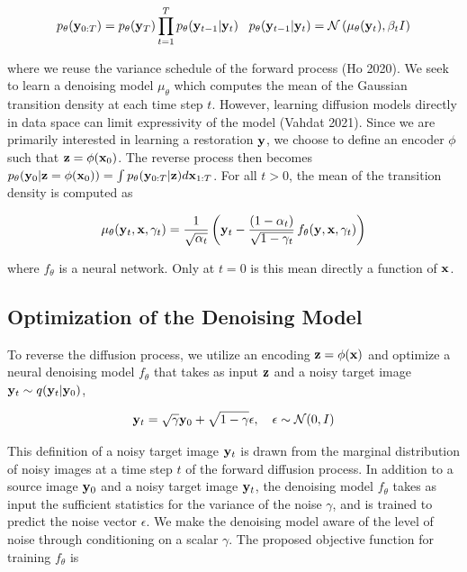 \documentclass{article}
\begin{document}
\begin{equation}
p_{\theta}(\bold{y}_{0:T}) = p_{\theta}(\bold{y}_{T})\prod_{t=1}^{T} p_{\theta}(\bold{y}_{t-1}|\bold{y}_{t}) \;\;\; p_{\theta}(\bold{y}_{t-1}|\bold{y}_{t}) = \mathcal{N}\left(\mu_{\theta}(\bold{y}_{t}),\beta_{t}I\right)
\end{equation}

where we reuse the variance schedule of the forward process (Ho 2020). We seek to learn a denoising model $\mu_{\theta}$ which computes the mean of the Gaussian transition density at each time step $t$. However, learning diffusion models directly in data space can limit expressivity of the model (Vahdat 2021). Since we are primarily interested in learning a restoration $\bold{y}$, we choose to define an encoder $\phi$ such that $\bold{z} = \phi(\bold{x}_{0})$. The reverse process then becomes $p_{\theta}(\bold{y}_{0}|\bold{z}=\phi(\bold{x}_{0})) = \int p_{\theta}(\bold{y}_{0:T}|\bold{z})d\bold{x}_{1:T}$. For all $t > 0$, the mean of the transition density is computed as

\begin{equation}
\mu_{\theta}(\bold{y}_t, \bold{x}, \gamma_t) = \frac{1}{\sqrt{\alpha_t}} \left(\bold{y}_t - \frac{(1 - \alpha_t)}{\sqrt{1 - \gamma_t}} \, f_{\theta}(\bold{y}, \bold{x}, \gamma_t) \right)
\end{equation}

where $f_{\theta}$ is a neural network. Only at $t=0$ is this mean directly a function of $\bold{x}$. 

\subsection{Optimization of the Denoising Model}

To reverse the diffusion process, we utilize an encoding $\bold{z} = \phi(\bold{x})$ and optimize a neural denoising model $f_{\theta}$ that takes as input $\bold{z}$ and a noisy target image $\bold{y}_t \sim q(\bold{y}_t|\bold{y}_0)$,

\begin{equation}
\bold{y}_t = \sqrt{\gamma} \bold{y}_0 + \sqrt{1 - \gamma} \epsilon, \quad \epsilon \sim \mathcal{N}(0, I)
\end{equation}

This definition of a noisy target image $\bold{y}_t$ is drawn from the marginal distribution of noisy images at a time step $t$ of the forward diffusion process. In addition to a source image $\bold{y}_{0}$ and a noisy target image $\bold{y}_t$, the denoising model $f_{\theta}$ takes as input the sufficient statistics for the variance of the noise $\gamma$, and is trained to predict the noise vector $\epsilon$. We make the denoising model aware of the level of noise through conditioning on a scalar $\gamma$. The proposed objective function for training $f_{\theta}$ is
\end{document}
